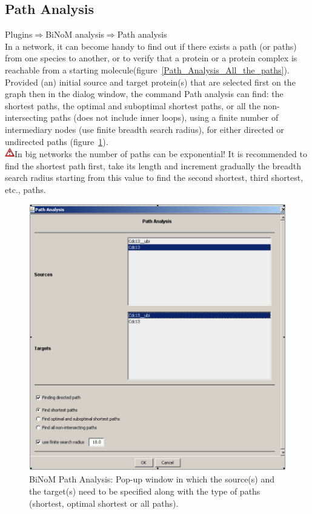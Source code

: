 \subsection{Path Analysis}
Plugins$\Rightarrow$BiNoM analysis$\Rightarrow$Path analysis\\
In a network, it can become handy to find out if there exists a path (or paths) from one species to another, or to verify that a protein or a protein complex is reachable from a starting molecule(figure~\ref{Path_Analysis_All_the_paths}). Provided (an) initial source and target protein(s) that are selected first on the graph then in the dialog window, the command Path analysis can find: the shortest paths, the optimal and suboptimal shortest paths, or all the non-intersecting paths (does not include inner loops), using a finite number of intermediary nodes (use finite breadth search radius), for either directed or undirected paths (figure~\ref{Path_Analysis_Pop-up_window}).\\
\includegraphics[width=12pt,height=12pt]{graphics/warning}In big networks the number of paths can be exponential! It is recommended to find the shortest path first, take its length and increment gradually the breadth search radius starting from this value to find the second shortest, third shortest, etc., paths.\\
\begin{figure}
\centering
\includegraphics[width=14 cm]{graphics/Path_Analysis_Pop-up_window}
\caption{BiNoM Path Analysis: Pop-up window in which the source(s) and the target(s) need to be specified along with the type of paths (shortest, optimal shortest or all paths).}
\label{Path_Analysis_Pop-up_window}
\end{figure}
